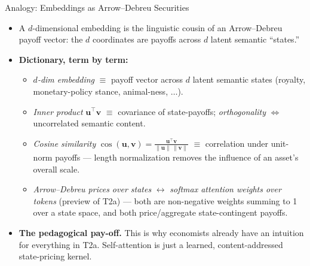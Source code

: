 \begin{frame}{Analogy: Embeddings as Arrow--Debreu Securities}
\begin{itemize}
\item A $d$-dimensional embedding is the linguistic cousin of an Arrow--Debreu payoff vector: the $d$ coordinates are payoffs across $d$ latent semantic ``states.''

\medskip
\item \textbf{Dictionary, term by term:}
\begin{itemize}
    \item \emph{$d$-dim embedding} $\equiv$ payoff vector across $d$ latent semantic states (royalty, monetary-policy stance, animal-ness, $\ldots$).
    \item \emph{Inner product} $\mathbf{u}^{\top}\mathbf{v}$ $\equiv$ covariance of state-payoffs; \emph{orthogonality} $\Leftrightarrow$ uncorrelated semantic content.
    \item \emph{Cosine similarity} $\cos(\mathbf{u}, \mathbf{v}) = \tfrac{\mathbf{u}^{\top}\mathbf{v}}{\|\mathbf{u}\|\,\|\mathbf{v}\|}$ $\equiv$ correlation under unit-norm payoffs --- length normalization removes the influence of an asset's overall scale.
    \item \emph{Arrow--Debreu prices over states} $\leftrightarrow$ \emph{softmax attention weights over tokens} (preview of T2a) --- both are non-negative weights summing to 1 over a state space, and both price/aggregate state-contingent payoffs.
\end{itemize}

\medskip
\item \textbf{The pedagogical pay-off.} This is why economists already have an intuition for everything in T2a. Self-attention is just a learned, content-addressed state-pricing kernel.
\end{itemize}
\end{frame}

